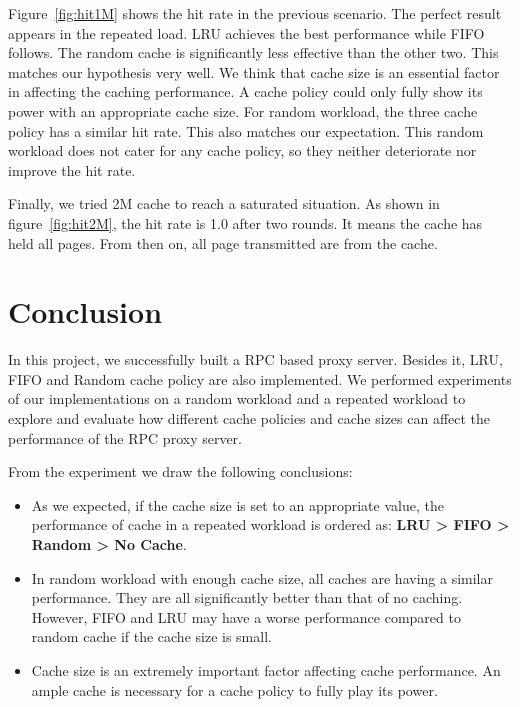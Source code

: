 \documentclass[paper=a4, fontsize=11pt]{scrartcl} %
\numberwithin{equation}{section} %
\numberwithin{figure}{section} %
\numberwithin{table}{section} %
\begin{document}
\vspace{1em}

Figure~\ref{fig:hit1M} shows the hit rate in the previous scenario. The perfect result appears in the repeated load. LRU achieves the best performance while FIFO follows. The random cache is significantly less effective than the other two. This matches our hypothesis very well. We think that cache size is an essential factor in affecting the caching performance. A cache policy could only fully show its power with an appropriate cache size. For random workload, the three cache policy has a similar hit rate. This also matches our expectation. This random workload does not cater for any cache policy, so they neither deteriorate nor improve the hit rate. 

\vspace{1em}

Finally, we tried 2M cache to reach a saturated situation. 
As shown in figure~\ref{fig:hit2M}, the hit rate is 1.0 after two rounds. It means the cache has held all pages. From then on, all page transmitted are from the cache. 


\section{Conclusion}
In this project, we successfully built a RPC based proxy server. Besides it, LRU, FIFO and Random cache policy are also implemented. We performed experiments of our implementations on a random workload and a repeated workload to explore and evaluate how different cache policies and cache sizes can affect the performance of the RPC proxy server. 

\vspace{1em}

From the experiment we draw the following conclusions:
\begin{itemize}
\item As we expected, if the cache size is set to an appropriate value, the 
  performance of cache in a repeated workload is ordered as:
  \textbf{LRU > FIFO > Random > No Cache}.
\item In random workload with enough cache size, all caches are having a similar performance. They are all significantly better than that of no caching. However, FIFO and LRU may have a worse performance compared to random cache if the cache size is small. 
\item Cache size is an extremely important factor affecting cache performance. An ample cache is necessary for a cache policy to fully play its power.
\end{itemize}
\end{document}
